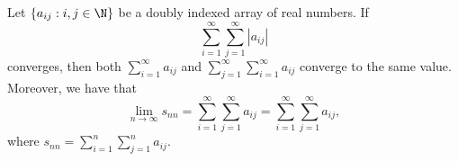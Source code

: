 \begin{tcolorbox}
\begin{thm}
    Let \( \{ a_{ij} : i,j \in \N  \}\) be a doubly indexed array of real numbers. If 
    \[ \sum_{i=1}^{\infty} \sum_{j=1}^{\infty} |a_{ij}|\]
    converges, then both \( \sum_{i=1}^{\infty} a_{ij}\) and \( \sum_{j=1}^{\infty} \sum_{i=1}^{\infty} a_{ij} \) converge to the same value. Moreover, we have that 
    \[ \lim_{n \to \infty} s_{nn} = \sum_{i=1}^{\infty} \sum_{j=1}^{\infty} a_{ij} = \sum_{i=1}^{\infty} \sum_{j=1}^{\infty} a_{ij},\]
    where \( s_{nn} = \sum_{i=1}^{n} \sum_{j=1}^{n} a_{ij}\). 
\end{thm}
\end{tcolorbox}






